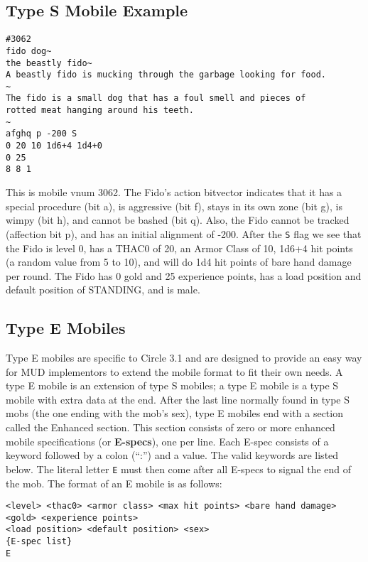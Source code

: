 \documentclass[11pt]{article}
\begin{document}
\subsection{Type S Mobile Example}
\begin{verbatim}
#3062
fido dog~
the beastly fido~
A beastly fido is mucking through the garbage looking for food.
~
The fido is a small dog that has a foul smell and pieces of
rotted meat hanging around his teeth.
~
afghq p -200 S
0 20 10 1d6+4 1d4+0
0 25
8 8 1
\end{verbatim}
\par This is mobile vnum 3062.  The Fido's action bitvector indicates that it has a special procedure (bit a), is aggressive (bit f), stays in its own zone (bit g), is wimpy (bit h), and cannot be bashed (bit q). Also, the Fido cannot be tracked (affection bit p), and has an initial alignment of -200. After the \texttt{S} flag we see that the Fido is level 0, has a THAC0 of 20, an Armor Class of 10, 1d6+4 hit points (a random value from 5 to 10), and will do 1d4 hit points of bare hand damage per round.  The Fido has 0 gold and 25 experience points, has a load position and default position of STANDING, and is male.

\subsection{Type E Mobiles}
Type E mobiles are specific to Circle 3.1 and are designed to provide an easy way for MUD implementors to extend the mobile format to fit their own needs.  A type E mobile is an extension of type S mobiles; a type E mobile is a type S mobile with extra data at the end.  After the last line normally found in type S mobs (the one ending with the mob's sex), type E mobiles end with a section called the Enhanced section.  This section consists of zero or more enhanced mobile specifications (or {\bf E-specs}), one per line.  Each E-spec consists of a keyword followed by a colon (``:'') and a value.  The valid keywords are listed below.  The literal letter \texttt{E} must then come after all E-specs to signal the end of the mob.\newline
The format of an E mobile is as follows:
\begin{verbatim}
<level> <thac0> <armor class> <max hit points> <bare hand damage>
<gold> <experience points>
<load position> <default position> <sex>
{E-spec list}
E
\end{verbatim}
\end{document}
